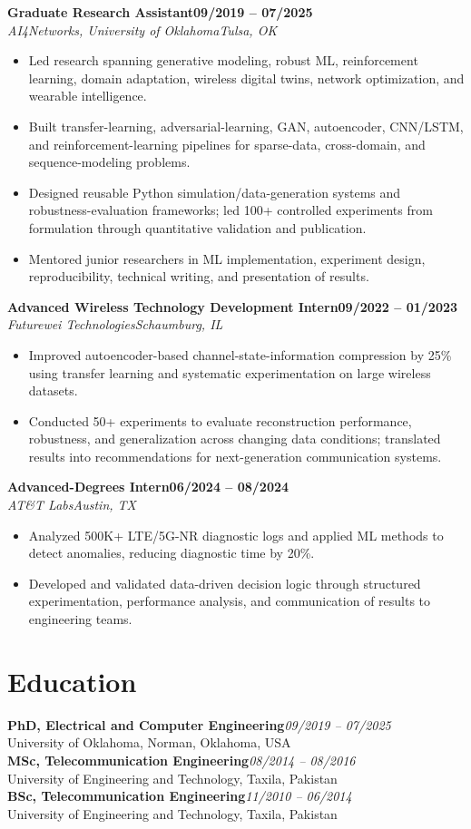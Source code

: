 \documentclass[10pt,letterpaper]{extarticle}
\newcommand{\role}[4]{\Needspace{3\baselineskip}\textbf{#1}\hfill\textbf{#2}\\[-1pt]\textit{#3}\hfill\textit{#4}\par}
\begin{document}
\role{Graduate Research Assistant}{09/2019 -- 07/2025}{AI4Networks, University of Oklahoma}{Tulsa, OK}
\begin{itemize}
\item Led research spanning generative modeling, robust ML, reinforcement learning, domain adaptation, wireless digital twins, network optimization, and wearable intelligence.
\item Built transfer-learning, adversarial-learning, GAN, autoencoder, CNN/LSTM, and reinforcement-learning pipelines for sparse-data, cross-domain, and sequence-modeling problems.
\item Designed reusable Python simulation/data-generation systems and robustness-evaluation frameworks; led 100+ controlled experiments from formulation through quantitative validation and publication.
\item Mentored junior researchers in ML implementation, experiment design, reproducibility, technical writing, and presentation of results.
\end{itemize}

\role{Advanced Wireless Technology Development Intern}{09/2022 -- 01/2023}{Futurewei Technologies}{Schaumburg, IL}
\begin{itemize}
\item Improved autoencoder-based channel-state-information compression by 25\% using transfer learning and systematic experimentation on large wireless datasets.
\item Conducted 50+ experiments to evaluate reconstruction performance, robustness, and generalization across changing data conditions; translated results into recommendations for next-generation communication systems.
\end{itemize}

\role{Advanced-Degrees Intern}{06/2024 -- 08/2024}{AT\&T Labs}{Austin, TX}
\begin{itemize}
\item Analyzed 500K+ LTE/5G-NR diagnostic logs and applied ML methods to detect anomalies, reducing diagnostic time by 20\%.
\item Developed and validated data-driven decision logic through structured experimentation, performance analysis, and communication of results to engineering teams.
\end{itemize}

\section{Education}
\textbf{PhD, Electrical and Computer Engineering}\hfill\textit{09/2019 -- 07/2025}\\
University of Oklahoma, Norman, Oklahoma, USA\\
\textbf{MSc, Telecommunication Engineering}\hfill\textit{08/2014 -- 08/2016}\\
University of Engineering and Technology, Taxila, Pakistan\\
\textbf{BSc, Telecommunication Engineering}\hfill\textit{11/2010 -- 06/2014}\\
University of Engineering and Technology, Taxila, Pakistan
\end{document}
